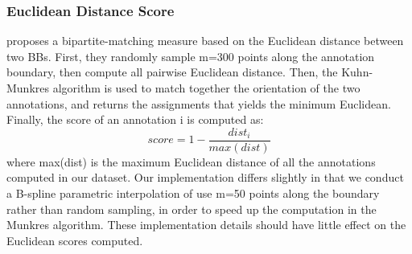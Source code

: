 \documentclass[12pt]{article}
\begin{document}
\subsubsection{Euclidean Distance Score}
\par \cite{Vittayakorn2011} proposes a bipartite-matching measure based on the Euclidean distance between two BBs. First, they randomly sample m=300 points along the annotation boundary, then compute all pairwise Euclidean distance. Then, the Kuhn-Munkres algorithm is used to match together the orientation of the two annotations, and returns the assignments that yields the minimum Euclidean. Finally, the score of an annotation i is computed as:
\begin{equation}
score = 1-\frac{dist_i}{max(dist)}
\end{equation} where max(dist) is the maximum Euclidean distance of all the annotations computed in our dataset. Our implementation differs slightly in that we conduct a B-spline parametric interpolation of use m=50 points along the boundary rather than random sampling, in order to speed up the computation in the Munkres algorithm. These implementation details should have little effect on the Euclidean scores computed.



\end{document}
